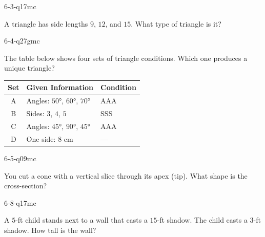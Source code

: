 \begin{practiceQuestion}{6-3-q17}{mc}
\begin{questionText}
A triangle has side lengths $9$, $12$, and $15$. What type of triangle is it?
\end{questionText}
\end{practiceQuestion}

\begin{practiceQuestion}{6-4-q27}{gmc}
\begin{questionText}
The table below shows four sets of triangle conditions. Which one produces a unique triangle?

\begin{center}
\begin{tabular}{|c|l|l|}
\hline
\textbf{Set} & \textbf{Given Information} & \textbf{Condition} \\
\hline
A & Angles: $50°$, $60°$, $70°$ & AAA \\
\hline
B & Sides: $3$, $4$, $5$ & SSS \\
\hline
C & Angles: $45°$, $90°$, $45°$ & AAA \\
\hline
D & One side: $8$ cm & --- \\
\hline
\end{tabular}
\end{center}
\end{questionText}
\end{practiceQuestion}

\begin{practiceQuestion}{6-5-q09}{mc}
\begin{questionText}
You cut a cone with a vertical slice through its apex (tip). What shape is the cross-section?
\end{questionText}
\end{practiceQuestion}

\begin{practiceQuestion}{6-8-q17}{mc}
\begin{questionText}
A $5$-ft child stands next to a wall that casts a $15$-ft shadow. The child casts a $3$-ft shadow. How tall is the wall?
\end{questionText}
\end{practiceQuestion}


